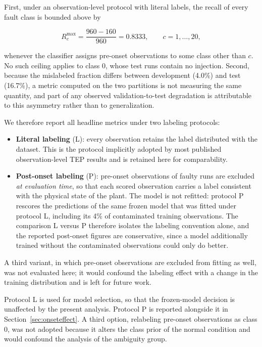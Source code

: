 \documentclass[10pt,twocolumn,a4paper]{article}
\begin{document}
First, under an observation-level protocol with literal labels, the recall of
every fault class is bounded above by

\begin{equation}
R^{\max}_c=\frac{960-160}{960}=0.8333,\qquad c=1,\dots,20,
\label{eq:ceiling}
\end{equation}

whenever the classifier assigns pre-onset observations to some class other than
$c$. No such ceiling applies to class 0, whose test runs contain no injection.
Second, because the mislabeled fraction differs between development (4.0\%) and
test (16.7\%), a metric computed on the two partitions is not measuring the
same quantity, and part of any observed validation-to-test degradation is
attributable to this asymmetry rather than to generalization.

We therefore report all headline metrics under two labeling protocols:

\begin{itemize}
  \item \textbf{Literal labeling} (L): every observation retains the label
  distributed with the dataset. This is the protocol implicitly adopted by most
  published observation-level TEP results and is retained here for
  comparability.
  \item \textbf{Post-onset labeling} (P): pre-onset observations of faulty runs
  are excluded \emph{at evaluation time}, so that each scored observation
  carries a label consistent with the physical state of the plant. The model is
  not refitted: protocol P rescores the predictions of the same frozen model
  that was fitted under protocol L, including its 4\% of contaminated training
  observations. The comparison L versus P therefore isolates the labeling
  convention alone, and the reported post-onset figures are conservative, since
  a model additionally trained without the contaminated observations could only
  do better.
\end{itemize}

A third variant, in which pre-onset observations are excluded from fitting as
well, was not evaluated here; it would confound the labeling effect with a
change in the training distribution and is left for future work.

Protocol L is used for model selection, so that the frozen-model decision is
unaffected by the present analysis. Protocol P is reported alongside it in
Section~\ref{sec:onseteffect}. A third option, relabeling pre-onset
observations as class 0, was not adopted because it alters the class prior of
the normal condition and would confound the analysis of the ambiguity group.
\end{document}
